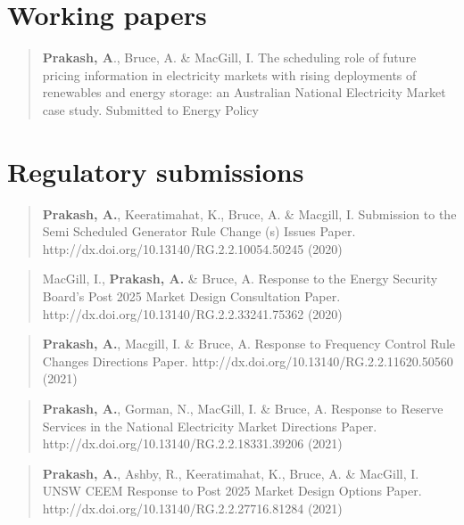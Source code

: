 \documentclass[12pt,a4paper,]{report}
\begin{document}
\hypertarget{working-papers}{%
\section*{Working papers}\label{working-papers}}

\begin{quote}
\textbf{Prakash, A}., Bruce, A. \& MacGill, I. The scheduling role of
future pricing information in electricity markets with rising
deployments of renewables and energy storage: an Australian National
Electricity Market case study. Submitted to Energy Policy
\end{quote}

\hypertarget{regulatory-submissions}{%
\section*{Regulatory submissions}\label{regulatory-submissions}}

\begin{quote}
\textbf{Prakash, A.}, Keeratimahat, K., Bruce, A. \& Macgill, I.
Submission to the Semi Scheduled Generator Rule Change (s) Issues Paper.
http://dx.doi.org/10.13140/RG.2.2.10054.50245 (2020)
\end{quote}

\begin{quote}
MacGill, I., \textbf{Prakash, A.} \& Bruce, A. Response to the Energy
Security Board's Post 2025 Market Design Consultation Paper.
http://dx.doi.org/10.13140/RG.2.2.33241.75362 (2020)
\end{quote}

\begin{quote}
\textbf{Prakash, A.}, Macgill, I. \& Bruce, A. Response to Frequency
Control Rule Changes Directions Paper.
http://dx.doi.org/10.13140/RG.2.2.11620.50560 (2021)
\end{quote}

\begin{quote}
\textbf{Prakash, A.}, Gorman, N., MacGill, I. \& Bruce, A. Response to
Reserve Services in the National Electricity Market Directions Paper.
http://dx.doi.org/10.13140/RG.2.2.18331.39206 (2021)
\end{quote}

\begin{quote}
\textbf{Prakash, A.}, Ashby, R., Keeratimahat, K., Bruce, A. \& MacGill,
I. UNSW CEEM Response to Post 2025 Market Design Options Paper.
http://dx.doi.org/10.13140/RG.2.2.27716.81284 (2021)
\end{quote}
\end{document}
